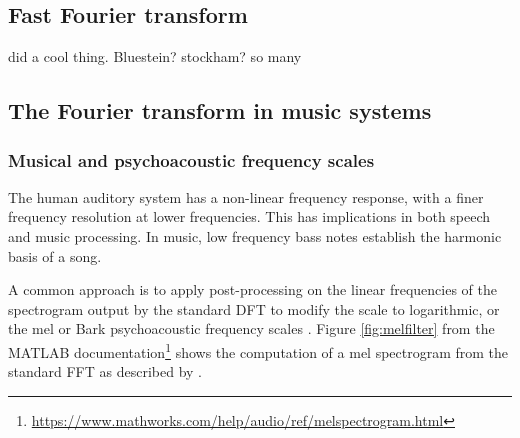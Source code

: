 \documentclass[letter,12pt,notitlepage]{article}
\begin{document}
\subsection{Fast Fourier transform}

\citet{cooleytukey} did a cool thing. Bluestein? stockham? so many

\subsection{The Fourier transform in music systems}

\subsubsection{Musical and psychoacoustic frequency scales}
\label{sec:freqscales}



The human auditory system has a non-linear frequency response, with a finer frequency resolution at lower frequencies.  This has implications in both speech and music processing. In music, low frequency bass notes establish the harmonic basis of a song. 


A common approach is to apply post-processing on the linear frequencies of the spectrogram output by the standard DFT to modify the scale to logarithmic, or the mel or Bark psychoacoustic frequency scales . Figure \ref{fig:melfilter} from the MATLAB documentation\footnote{\href{https://www.mathworks.com/help/audio/ref/melspectrogram.html}{https://www.mathworks.com/help/audio/ref/melspectrogram.html}} shows the computation of a mel spectrogram from the standard FFT as described by \citet[463]{melbook}.

\end{document}
